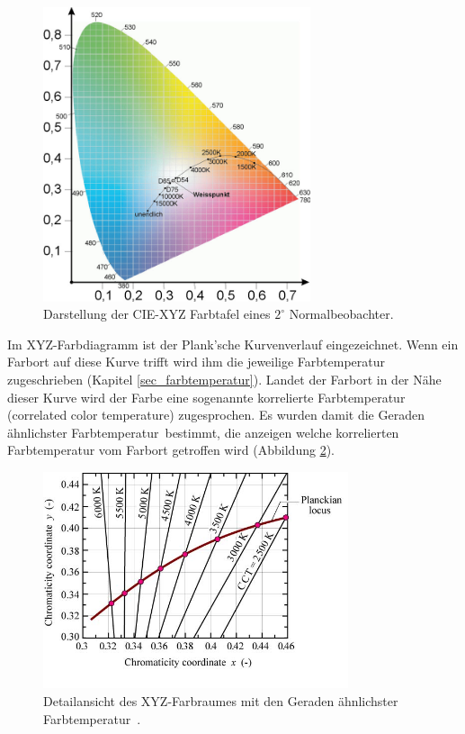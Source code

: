 \begin{figure}[H]     %
\centering
\includegraphics[width=0.7\textwidth]{bilder/xyz1} 
\caption {Darstellung der CIE-XYZ Farbtafel eines $2^\circ$ Normalbeobachter\protect\footnotemark .}\label{b_xyz1}
\end{figure}


\noindent Im XYZ-Farbdiagramm ist der Plank'sche Kurvenverlauf eingezeichnet. Wenn ein Farbort auf diese Kurve trifft wird ihm die jeweilige Farbtemperatur zugeschrieben (Kapitel \ref{sec_farbtemperatur}). Landet der Farbort in der Nähe dieser Kurve wird der Farbe eine sogenannte korrelierte Farbtemperatur (correlated color temperature) zugesprochen. Es wurden damit die \glqq Geraden ähnlichster Farbtemperatur\grqq\ bestimmt, die anzeigen welche korrelierten Farbtemperatur vom Farbort getroffen wird (Abbildung \ref{b_cct}).    

\begin{figure}[H]     %
\centering
\includegraphics[width=0.8\textwidth]{bilder/cct} 
\caption {Detailansicht des XYZ-Farbraumes mit den \glqq Geraden ähnlichster Farbtemperatur\grqq\ \protect\footnotemark .}\label{b_cct}
\end{figure}

